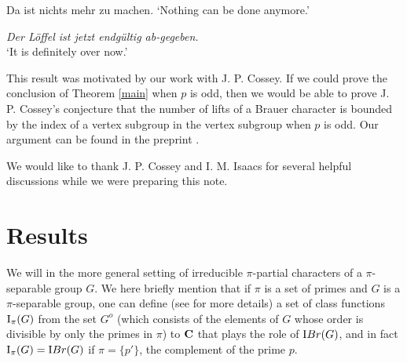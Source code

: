\documentclass[12pt]{article}
\def\ibr#1{{\textrm IBr} (#1)}
\def\norm#1#2{{\textrm N}_{#1} (#2)}
\def\I#1#2{{\textrm I}_{#1} (#2)}
\def\Ipi#1{\I {\pi}{#1}}
\def\phi{\varphi}
\begin{document}
\begin{exe}
\ex \label{zu machen}
Da ist nichts mehr zu machen. \textnormal{`Nothing can be done anymore.'}
\begin{xlist}
\ex
 \textit{Der L\"offel ist jetzt endg\"ultig ab-gegeben.}\\
\textnormal{`It is definitely over now.'}
\end{xlist}
\end{exe}




This result
was motivated by our work with J. P. Cossey. If we could prove the
conclusion of Theorem \ref{main} when $p$ is odd, then we would be
able to prove J. P. Cossey's conjecture that the number of lifts of
a Brauer character is bounded by the index of a vertex subgroup in
the vertex subgroup when $p$ is odd. Our argument can be found in
the preprint \cite{preprint}.

We would like to thank J. P. Cossey and I. M. Isaacs for several
helpful discussions while we were preparing this note.

\section{Results}

We will in the more general setting of irreducible $\pi$-partial
characters of a $\pi$-separable group $G$.  We here briefly mention
that if $\pi$ is a set of primes and $G$ is a $\pi$-separable group,
one can define (see \cite{pipart} for more details) a set of class
functions $\Ipi G$ from the set $G^o$ (which consists of the
elements of $G$ whose order is divisible by only the primes in
$\pi$) to ${\bf C}$ that plays the role of $\ibr G$, and in fact
$\Ipi G = \ibr G$ if $\pi = \{ p' \}$, the complement of the prime
$p$.

%
\end{document}
